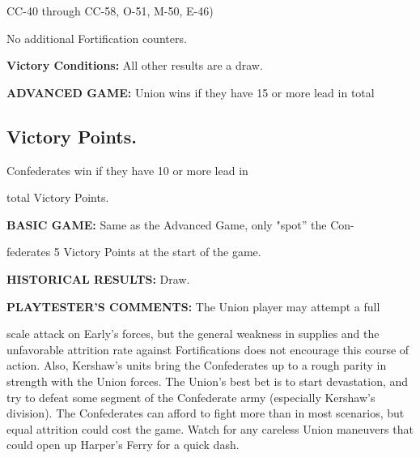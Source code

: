\begin{scenariodata}
CC-40 through CC-58, O-51, M-50, E-46)\\
\end{scenariodata}

\begin{scenariodata}
No additional Fortification counters.\\
\end{scenariodata}

\begin{scenariodata}
\textbf{Victory Conditions:} All other results are a draw.\\
\end{scenariodata}

\begin{scenariodata}
\textbf{ADVANCED GAME:} Union wins if they have 15 or more lead in total\\
\end{scenariodata}

\subsection*{Victory Points.}

\begin{scenariodata}
Confederates win if they have 10 or more lead in\\
\end{scenariodata}

total Victory Points.

\begin{scenariodata}
\textbf{BASIC GAME:} Same as the Advanced Game, only "spot'' the Con-\\
\end{scenariodata}

federates 5 Victory Points at the start of the game.

\begin{scenariodata}
\textbf{HISTORICAL RESULTS:} Draw.\\
\end{scenariodata}

\begin{scenariodata}
\textbf{PLAYTESTER'S COMMENTS:} The Union player may attempt a full\\
\end{scenariodata}

scale attack on Early's forces, but the general weakness in supplies and the unfavorable attrition rate against Fortifications does not encourage this course of action. Also, Kershaw's units bring the Confederates up to a rough parity in strength with the Union forces. The Union's best bet is to start devastation, and try to defeat some segment of the Confederate army (especially Kershaw's division). The Confederates can afford to fight more than in most scenarios, but equal attrition could cost the game. Watch for any careless Union maneuvers that could open up Harper's Ferry for a quick dash.

